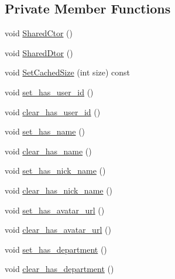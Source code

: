 \subsection*{Private Member Functions}
\begin{DoxyCompactItemize}
\item 
void \hyperlink{class_i_m_1_1_base_define_1_1_client_user_info_a4f6fabf6e4531a919c14f0bb01dae913}{Shared\+Ctor} ()
\item 
void \hyperlink{class_i_m_1_1_base_define_1_1_client_user_info_a3ab40aaa813af05a76522870bf23d480}{Shared\+Dtor} ()
\item 
void \hyperlink{class_i_m_1_1_base_define_1_1_client_user_info_abc13bd49b8c3292cdf377b6c23649fee}{Set\+Cached\+Size} (int size) const 
\item 
void \hyperlink{class_i_m_1_1_base_define_1_1_client_user_info_a3b605d4a9accdec4f922b716792e6add}{set\+\_\+has\+\_\+user\+\_\+id} ()
\item 
void \hyperlink{class_i_m_1_1_base_define_1_1_client_user_info_a85533cbdaaac7ed619ca4f3f41e5e482}{clear\+\_\+has\+\_\+user\+\_\+id} ()
\item 
void \hyperlink{class_i_m_1_1_base_define_1_1_client_user_info_a3f7bd3bed7fbe8bf4d0572203cb8efb2}{set\+\_\+has\+\_\+name} ()
\item 
void \hyperlink{class_i_m_1_1_base_define_1_1_client_user_info_a878e3f3990471287fed0a1f082d7aff3}{clear\+\_\+has\+\_\+name} ()
\item 
void \hyperlink{class_i_m_1_1_base_define_1_1_client_user_info_a7caef3dd0070dc812bda25de0f574e8a}{set\+\_\+has\+\_\+nick\+\_\+name} ()
\item 
void \hyperlink{class_i_m_1_1_base_define_1_1_client_user_info_a0fb66ab79df06f8a73e672266be9b437}{clear\+\_\+has\+\_\+nick\+\_\+name} ()
\item 
void \hyperlink{class_i_m_1_1_base_define_1_1_client_user_info_ac0799eea47b0b2b74dcc12b5fa851364}{set\+\_\+has\+\_\+avatar\+\_\+url} ()
\item 
void \hyperlink{class_i_m_1_1_base_define_1_1_client_user_info_a4c83b3af55a570a19d3ab9851bd84d23}{clear\+\_\+has\+\_\+avatar\+\_\+url} ()
\item 
void \hyperlink{class_i_m_1_1_base_define_1_1_client_user_info_aab3fa7eeadb7c78bdaed0b523ed860d4}{set\+\_\+has\+\_\+department} ()
\item 
void \hyperlink{class_i_m_1_1_base_define_1_1_client_user_info_aa2393b37dd571f543c9acc0365a0742b}{clear\+\_\+has\+\_\+department} ()
\item 

\end{DoxyCompactItemize}
